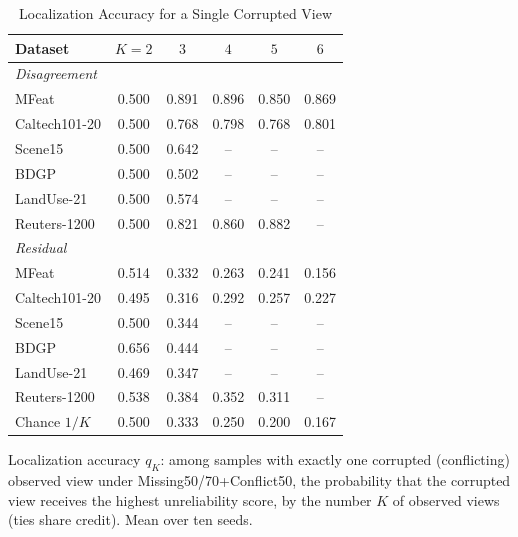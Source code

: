 \begin{table}[!t]
\caption{Localization Accuracy for a Single Corrupted View}
\label{tab:localization}
\centering
\footnotesize
\setlength{\tabcolsep}{3pt}
\begin{tabular}{lccccc}
\toprule
Dataset & $K{=}2$ & $3$ & $4$ & $5$ & $6$ \\
\midrule
\multicolumn{6}{l}{\emph{Disagreement}} \\
MFeat & 0.500 & 0.891 & 0.896 & 0.850 & 0.869 \\
Caltech101-20 & 0.500 & 0.768 & 0.798 & 0.768 & 0.801 \\
Scene15 & 0.500 & 0.642 & -- & -- & -- \\
BDGP & 0.500 & 0.502 & -- & -- & -- \\
LandUse-21 & 0.500 & 0.574 & -- & -- & -- \\
Reuters-1200 & 0.500 & 0.821 & 0.860 & 0.882 & -- \\
\multicolumn{6}{l}{\emph{Residual}} \\
MFeat & 0.514 & 0.332 & 0.263 & 0.241 & 0.156 \\
Caltech101-20 & 0.495 & 0.316 & 0.292 & 0.257 & 0.227 \\
Scene15 & 0.500 & 0.344 & -- & -- & -- \\
BDGP & 0.656 & 0.444 & -- & -- & -- \\
LandUse-21 & 0.469 & 0.347 & -- & -- & -- \\
Reuters-1200 & 0.538 & 0.384 & 0.352 & 0.311 & -- \\
\midrule
Chance $1/K$ & 0.500 & 0.333 & 0.250 & 0.200 & 0.167 \\
\bottomrule
\end{tabular}
\par\smallskip
\parbox{\linewidth}{\scriptsize Localization accuracy $q_K$: among samples with exactly one corrupted (conflicting) observed view under Missing50/70+Conflict50, the probability that the corrupted view receives the highest unreliability score, by the number $K$ of observed views (ties share credit). Mean over ten seeds.}
\end{table}

